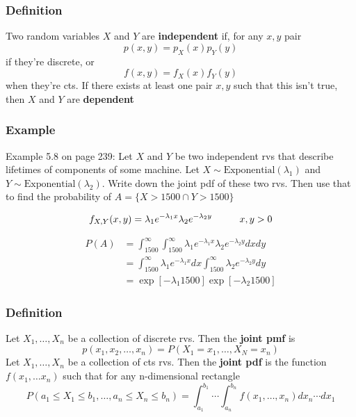 \documentclass{beamer}
\begin{document}
\begin{frame}
\frametitle{Definition}

Two random variables $X$ and $Y$ are \textbf{independent} if, for any $x,y$ pair
\[
p(x,y) = p_X(x)p_Y(y)
\]
if they're discrete, or 
\[
f(x,y) = f_X(x)f_Y(y)
\]
when they're cts. If there exists at least one pair $x,y$ such that this isn't true, then $X$ and $Y$ are \textbf{dependent}

\end{frame}
\begin{frame}
\frametitle{Example}

Example 5.8 on page 239: Let $X$ and $Y$ be two independent rvs that describe lifetimes of components of some machine. Let $X \sim \text{Exponential}(\lambda_1)$ and $Y \sim \text{Exponential}(\lambda_2)$. Write down the joint pdf of these two rvs. Then use that to find the probability of $A= \{X > 1500 \cap Y > 1500 \}$
\pause
\newline

\[
f_{X,Y}(x,y) = \lambda_1 e^{-\lambda_1 x}\lambda_2 e^{-\lambda_2 y} \hspace{10mm} x,y > 0
\]

\begin{align*}
P(A) &= \int_{1500}^{\infty} \int_{1500}^{\infty} \lambda_1 e^{-\lambda_1 x}\lambda_2 e^{-\lambda_2 y}dxdy\\
&= \int_{1500}^{\infty}\lambda_1 e^{-\lambda_1 x} dx \int_{1500}^{\infty}\lambda_2 e^{-\lambda_2 y}dy \\
&= \exp\left[ - \lambda_1 1500 \right] \exp\left[ -\lambda_2 1500\right]
\end{align*}


\end{frame}

\begin{frame}
\frametitle{Definition}

Let $X_1, \ldots, X_n$ be a collection of discrete rvs. Then the \textbf{joint pmf} is
\[
p(x_1, x_2, \ldots, x_n) = P(X_1 = x_1, \ldots, X_N = x_n)
\]
Let $X_1, \ldots, X_n$ be a collection of cts rvs. Then the \textbf{joint pdf} is the function $f(x_1, \ldots x_n)$ such that for any n-dimensional rectangle 
\[
P(a_1 \le X_1 \le b_1, \ldots, a_n \le X_n \le b_n) = \int_{a_1}^{b_1} \cdots \int_{a_n}^{b_n} f(x_1, \ldots, x_n) dx_n \cdots dx_1
\]

\end{frame}
\end{document}
